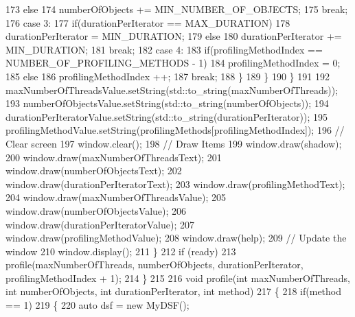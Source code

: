 \begin{DoxyCodeInclude}
173                         \textcolor{keywordflow}{else}
174                             numberOfObjects += MIN\_NUMBER\_OF\_OBJECTS;
175                         \textcolor{keywordflow}{break};
176                     \textcolor{keywordflow}{case} 3:
177                         \textcolor{keywordflow}{if}(durationPerIterator == MAX\_DURATION)
178                             durationPerIterator = MIN\_DURATION;
179                         \textcolor{keywordflow}{else}
180                             durationPerIterator += MIN\_DURATION;
181                         \textcolor{keywordflow}{break};
182                     \textcolor{keywordflow}{case} 4:
183                         \textcolor{keywordflow}{if}(profilingMethodIndex == NUMBER\_OF\_PROFILING\_METHODS - 1)
184                             profilingMethodIndex = 0;
185                         \textcolor{keywordflow}{else}
186                             profilingMethodIndex ++;
187                         \textcolor{keywordflow}{break};
188                 \}
189             \}
190         \}
191         
192         maxNumberOfThreadsValue.setString(std::to\_string(maxNumberOfThreads));
193         numberOfObjectsValue.setString(std::to\_string(numberOfObjects));
194         durationPerIteratorValue.setString(std::to\_string(durationPerIterator));
195         profilingMethodValue.setString(profilingMethods[profilingMethodIndex]);
196         \textcolor{comment}{// Clear screen}
197         window.clear();
198         \textcolor{comment}{// Draw Items}
199         window.draw(shadow);
200         window.draw(maxNumberOfThreadsText);
201         window.draw(numberOfObjectsText);
202         window.draw(durationPerIteratorText);
203         window.draw(profilingMethodText);
204         window.draw(maxNumberOfThreadsValue);
205         window.draw(numberOfObjectsValue);
206         window.draw(durationPerIteratorValue);
207         window.draw(profilingMethodValue);
208         window.draw(help);
209         \textcolor{comment}{// Update the window}
210         window.display();
211     \}
212     \textcolor{keywordflow}{if} (ready)
213         profile(maxNumberOfThreads, numberOfObjects, durationPerIterator, profilingMethodIndex + 1);
214 \}
215 
216 \textcolor{keywordtype}{void} profile(\textcolor{keywordtype}{int} maxNumberOfThreads, \textcolor{keywordtype}{int} numberOfObjects, \textcolor{keywordtype}{int} durationPerIterator, \textcolor{keywordtype}{int} method)
217 \{
218     \textcolor{keywordflow}{if}(method == 1)
219     \{
220         \textcolor{keyword}{auto} dsf = \textcolor{keyword}{new} MyDSF();

\end{DoxyCodeInclude}
